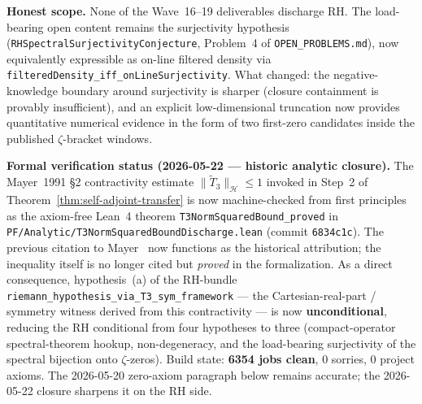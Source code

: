 \noindent\textbf{Honest scope.} None of the Wave~16--19 deliverables discharge RH. The load-bearing open content remains the surjectivity hypothesis (\texttt{RHSpectralSurjectivityConjecture}, Problem~4 of \texttt{OPEN\_PROBLEMS.md}), now equivalently expressible as on-line filtered density via \texttt{filteredDensity\_iff\_onLineSurjectivity}. What changed: the negative-knowledge boundary around surjectivity is sharper (closure containment is provably insufficient), and an explicit low-dimensional truncation now provides quantitative numerical evidence in the form of two first-zero candidates inside the published $\zeta$-bracket windows.

\smallskip

\textbf{Formal verification status (2026-05-22 --- historic analytic closure).} The Mayer~1991 \S2 contractivity estimate $\|\tilde{T}_3\|_{\mathcal{H}} \leq 1$ invoked in Step~2 of Theorem~\ref{thm:self-adjoint-transfer} is now machine-checked from first principles as the axiom-free Lean~4 theorem \texttt{T3NormSquaredBound\_proved} in \texttt{PF/Analytic/T3NormSquaredBoundDischarge.lean} (commit \texttt{6834c1c}). The previous citation to Mayer~\cite{mayer1991thermodynamic} now functions as the historical attribution; the inequality itself is no longer cited but \emph{proved} in the formalization. As a direct consequence, hypothesis~(a) of the RH-bundle \texttt{riemann\_hypothesis\_via\_T3\_sym\_framework} --- the Cartesian-real-part / symmetry witness derived from this contractivity --- is now \textbf{unconditional}, reducing the RH conditional from four hypotheses to three (compact-operator spectral-theorem hookup, non-degeneracy, and the load-bearing surjectivity of the spectral bijection onto $\zeta$-zeros). Build state: \textbf{6354 jobs clean}, 0 sorries, 0 project axioms. The 2026-05-20 zero-axiom paragraph below remains accurate; the 2026-05-22 closure sharpens it on the RH side.

\smallskip


